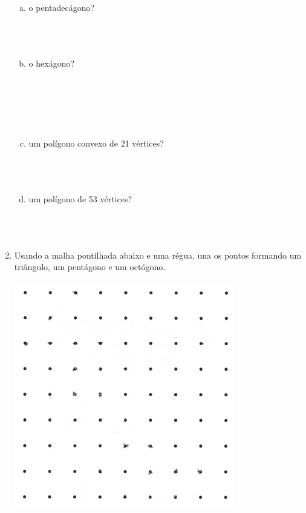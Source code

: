 \documentclass[a4paper,14pt]{article}
\begin{document}
\begin{multicols}{2}
\begin{enumerate}
\begin{enumerate}[a)]
				\item o pentadecágono? \\\\\\\\
				\item o hexágono? \\\\\\\\\\\\
				\item um polígono convexo de 21 vértices? \\\\\\\\
				\item um polígono de 53 vértices? \\\\\\\\
			\end{enumerate}
			\item Usando a malha pontilhada abaixo e uma régua, una os pontos formando um triângulo, um pentágono e um octógono. \\\\
			\includegraphics[width=1\linewidth]{6FMA88_imagens/imagem9}

\end{enumerate}
\end{multicols}
\end{document}
